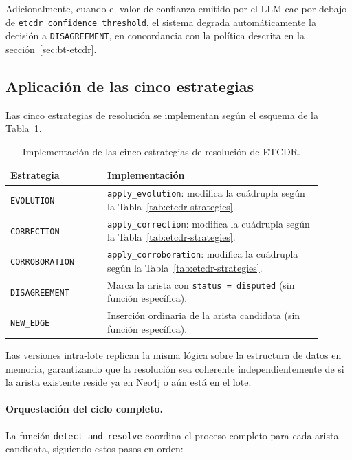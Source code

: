 Adicionalmente, cuando el valor de confianza emitido por el LLM cae por debajo de \texttt{etcdr\_confidence\_threshold}, el sistema degrada automáticamente la decisión a \texttt{DISAGREEMENT}, en concordancia con la política descrita en la sección~\ref{sec:bt-etcdr}.

\subsection{Aplicación de las cinco estrategias}

Las cinco estrategias de resolución se implementan según el esquema de la Tabla~\ref{tab:impl-etcdr-strategies}.

\begin{table}[H]
\centering
\small
\begin{tabular}{p{0.28\linewidth}p{0.62\linewidth}}
\hline
\textbf{Estrategia} & \textbf{Implementación} \\ \hline
\texttt{EVOLUTION} & \texttt{apply\_evolution}: modifica la cuádrupla según la Tabla~\ref{tab:etcdr-strategies}. \\
\texttt{CORRECTION} & \texttt{apply\_correction}: modifica la cuádrupla según la Tabla~\ref{tab:etcdr-strategies}. \\
\texttt{CORROBORATION} & \texttt{apply\_corroboration}: modifica la cuádrupla según la Tabla~\ref{tab:etcdr-strategies}. \\
\texttt{DISAGREEMENT} & Marca la arista con \texttt{status = disputed} (sin función específica). \\
\texttt{NEW\_EDGE} & Inserción ordinaria de la arista candidata (sin función específica). \\ \hline
\end{tabular}
\caption{Implementación de las cinco estrategias de resolución de ETCDR.}
\label{tab:impl-etcdr-strategies}
\end{table}

Las versiones intra-lote replican la misma lógica sobre la estructura de datos en memoria, garantizando que la resolución sea coherente independientemente de si la arista existente reside ya en Neo4j o aún está en el lote.

\paragraph{Orquestación del ciclo completo.}
La función \texttt{detect\_and\_resolve} coordina el proceso completo para cada arista candidata, siguiendo estos pasos en orden:

